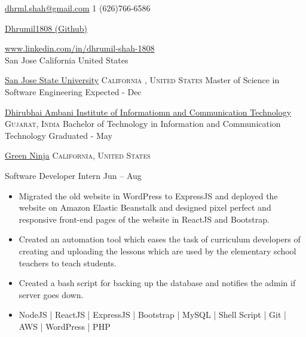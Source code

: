 \documentclass[10pt,a4paper]{article}
\begin{document}
\sloppy  %



\nobreakvspace{}

\noindent\href{mailto:dhrml.shah.at.gmail.dot.com}{dhrml.shah\mbox{}@\mbox{}gmail.com}\sbull
\textsmaller{+}1 (626)766-6586\sbull
{\newnums \href{https://github.com/Dhrumil1808}{Dhrumil1808 (Github)}\sbull
{\mewmums \href{https://www.linkedin.com/in/dhrumil-shah-1808/}{www.linkedin.com/in/dhrumil-shah-1808}
\\
{San Jose\sbull
California\sbull
United States
}


\headedsection
  {\href{http://www.sjsu.edu/}{San Jose State University} }
  {\textsc{ California , United States}} {%
  \headedsubsection
    {Master of Science in Software Engineering}
    {Expected - Dec }
    {}
}


\headedsection
  {\href{http://daiict.ac.in}{Dhirubhai Ambani Institute of Informatiomn and Communication Technology} }
  {\textsc{Gujarat, India}} {%
  \headedsubsection
    {Bachelor of Technology in Information and Communication Technology }
    {Graduated - May }
    {}
}

\spacedhrule{0.0em}{-0.4em}




\headedsection  %
  {\href{http://www.greenninja.org/}{Green Ninja}}
  {\textsc{ California, United States}} {%
  \headedsubsection
    {Software Developer Intern}
    {Jun  -- Aug }
    {\bodytext
    {
    \begin{itemize}
        \item  Migrated the old website in WordPress to ExpressJS and deployed the website on Amazon Elastic Beanstalk and designed pixel perfect and responsive front-end pages of the website in ReactJS and Bootstrap.
        \item Created an automation tool which eases the task of curriculum developers of creating and uploading the lessons which are used by the elementary school teachers to teach students.
        \item Created a bash script for backing up the database and notifies the admin if server goes down.
        \item NodeJS | ReactJS | ExpressJS | Bootstrap | MySQL | Shell Script | Git | AWS | WordPress  | PHP
    \end{itemize}}}
}

}}
\end{document}
